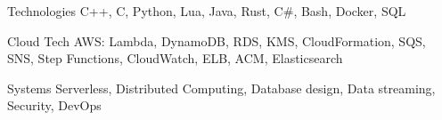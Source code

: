 


\begin{cvskills}


\cvskill
{Technologies}
    {
        C++, C, Python, Lua, Java, Rust, C\#, Bash, Docker, SQL
    }

\cvskill
{Cloud Tech}
    {
        AWS: Lambda, DynamoDB, RDS, KMS, CloudFormation, SQS, SNS, Step Functions,
        CloudWatch, ELB, ACM, Elasticsearch
    }

\cvskill
{Systems}
    {
        Serverless, Distributed Computing, Database design, Data streaming, Security,
        DevOps
    }



\end{cvskills}
